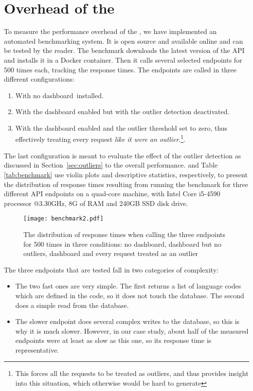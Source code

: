   
\newpage
\section{Overhead of the \tool}
\label{sec:overhead}

To measure the performance overhead of the \tool, we have implemented an automated benchmarking system. It is open source and available online and can be tested by the reader.  The benchmark downloads the latest version of the \zee API and installs it in a Docker container. Then it calls several selected endpoints for 500 times each, tracking the response times. The endpoints are called in three different configurations: 

	\begin{enumerate}
		\item With no dashboard installed.
		\item With the dashboard enabled but with the outlier detection deactivated.
		\item With the dashboard enabled and the outlier threshold set to zero, thus effectively treating every request {\em like it were an outlier}.\footnote{This forces all the requests to be treated as outliers, and thus provides insight into this situation, which otherwise would be hard to generate}.
	\end{enumerate}

The last configuration is meant to evaluate the effect of the outlier detection as discussed in Section~\ref{sec:outliers} to the overall performance.
%
 and Table \ref{tab:benchmark} use violin plots and descriptive statistics, respectively, to present the distribution of response times resulting from running the benchmark for three different API endpoints on a quad-core machine, with Intel Core i5-4590 processor @3.30GHz, 8G of RAM and 240GB SSD disk drive.


\begin{figure}[h!]
	\centering
	\texttt{[image: benchmark2.pdf]}
	\caption{The distribution of response times when calling the three endpoints for 500 times in three conditions: no dashboard, dashboard but no outliers, dashboard and every request treated as an outlier}
	\label{fig:bench}
\end{figure}




	The three endpoints that are tested fall in two categories of complexity: 
	\begin{itemize}
		\item The two fast ones are very simple. 
		The first returns a list of language codes which are defined in the code, so it does not touch the \zee database. The second does a simple read from the database. 
		\item The slower endpoint does several complex writes to the database, so this is why it is much slower. However, in our case study, about half of the measured endpoints were at least as slow as this one, so its response time is representative.
	\end{itemize}

